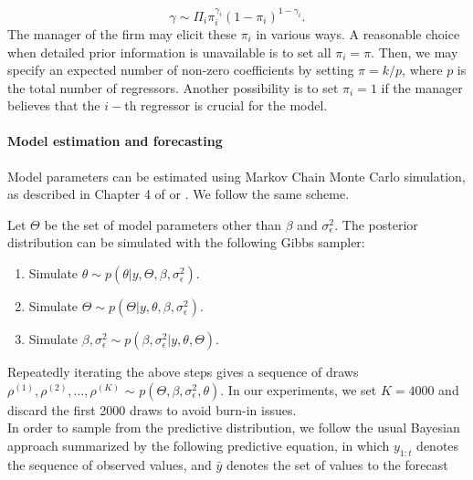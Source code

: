 $$
\gamma \sim \Pi_i \pi_i^{\gamma_i}(1-\pi_i)^{1-\gamma_i}.
$$
The manager of the firm may elicit these $\pi_i$ in various ways. A reasonable choice when detailed prior information is unavailable is to set all $\pi_i = \pi$. Then, we may specify an expected number of non-zero coefficients by setting $\pi = k/p$, where $p$ is the total number of regressors. Another possibility is to set $\pi_i = 1$ if the manager believes that the $i-$th regressor is crucial for the model. %

\paragraph{Model estimation and forecasting}\label{s:MCMC}

Model parameters can be estimated using Markov Chain Monte Carlo simulation, as described in Chapter 4 of \cite{petris2009dynamic} or \cite{scott2014predicting}. We follow the same scheme.

Let $\Theta$ be the set of model parameters other than $\beta$ and $\sigma^2_{\epsilon}$. The posterior distribution can be simulated with the following Gibbs sampler: %

\begin{enumerate}
\item Simulate $\theta \sim p(\theta | y, \Theta, \beta, \sigma^2_{\epsilon})$.
\item Simulate $\Theta \sim p(\Theta | y, \theta, \beta, \sigma^2_{\epsilon})$.
\item Simulate $\beta, \sigma^2_{\epsilon} \sim p(\beta, \sigma^2_{\epsilon} | y, \theta, \Theta)$.
\end{enumerate}
Repeatedly iterating the above steps gives a sequence of draws $\rho^{(1)}, \rho^{(2)}, \ldots, \rho^{(K)}$ $\sim$ $p(\Theta, \beta, \sigma^2_{\epsilon}, \theta)$. In our experiments, we set $K = 4000$ and discard the first 2000 draws to avoid burn-in issues. \\

In order to sample from the predictive distribution, we follow the usual Bayesian approach summarized by the following predictive equation, in which $y_{1:t}$ denotes the sequence of observed values, and $\bar{y}$ denotes the set of values to the forecast

